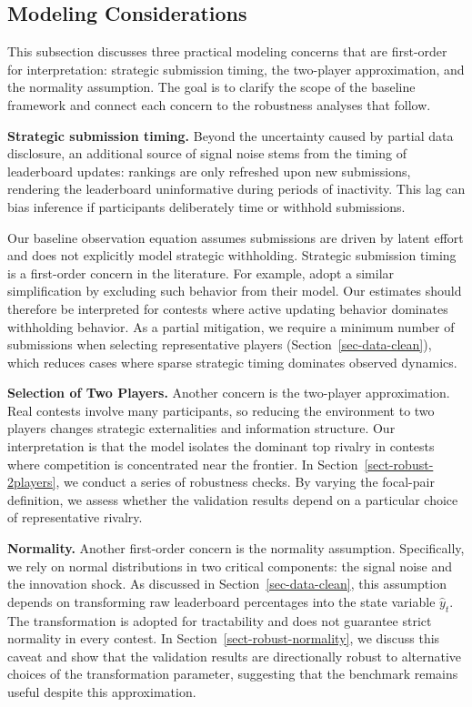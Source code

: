 \documentclass[mnsc]{informs3}
\begin{document}
\subsection{Modeling Considerations}\label{sect-concerns}

This subsection discusses three practical modeling concerns that are first-order for interpretation: strategic submission timing, the two-player approximation, and the normality assumption.
The goal is to clarify the scope of the baseline framework and connect each concern to the robustness analyses that follow.

\textbf{Strategic submission timing.}
Beyond the uncertainty caused by partial data disclosure, an additional source of signal noise stems from the timing of leaderboard updates: rankings are only refreshed upon new submissions, rendering the leaderboard uninformative during periods of inactivity.
This lag can bias inference if participants deliberately time or withhold submissions.


Our baseline observation equation assumes submissions are driven by latent effort and does not explicitly model strategic withholding.
Strategic submission timing is a first-order concern in the literature.
For example, \citet{lemus2021dynamic} adopt a similar simplification by excluding such behavior from their model.
Our estimates should therefore be interpreted for contests where active updating behavior dominates withholding behavior.
As a partial mitigation, we require a minimum number of submissions when selecting representative players (Section~\ref{sec-data-clean}), which reduces cases where sparse strategic timing dominates observed dynamics.


\textbf{Selection of Two Players.}
Another concern is the two-player approximation.
Real contests involve many participants, so reducing the environment to two players changes strategic externalities and information structure.
Our interpretation is that the model isolates the dominant top rivalry in contests where competition is concentrated near the frontier.
In Section~\ref{sect-robust-2players}, we conduct a series of robustness checks.
By varying the focal-pair definition, we assess whether the validation results depend on a particular choice of representative rivalry.

\textbf{Normality.}
Another first-order concern is the normality assumption.
Specifically, we rely on normal distributions in two critical components: the signal noise and the innovation shock.
As discussed in Section~\ref{sec-data-clean}, this assumption depends on transforming raw leaderboard percentages into the state variable $\hat{y}_t$.
The transformation is adopted for tractability and does not guarantee strict normality in every contest.
In Section~\ref{sect-robust-normality}, we discuss this caveat and show that the validation results are directionally robust to alternative choices of the transformation parameter, suggesting that the benchmark remains useful despite this approximation.
\end{document}

